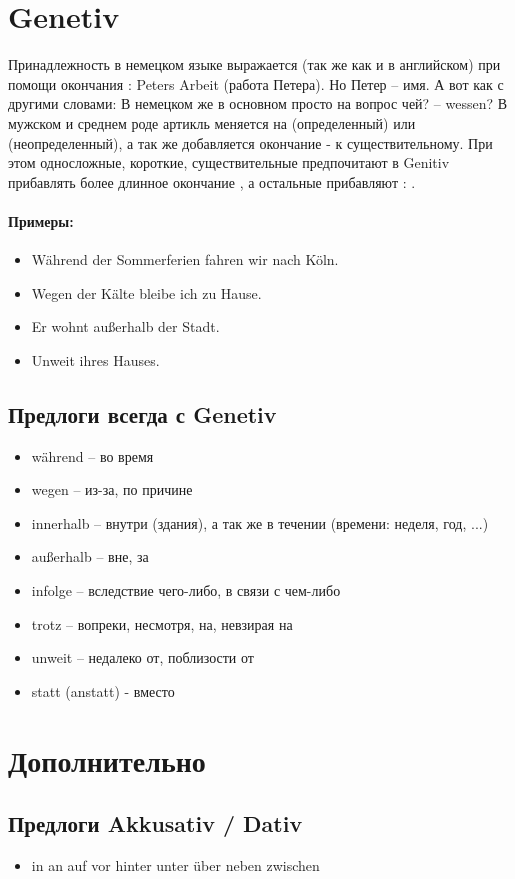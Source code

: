 \section{Genetiv}

Принадлежность в немецком языке выражается (так же как и в английском) при помощи окончания : Peters Arbeit (работа Петера). Но Петер – имя. А вот как с другими словами: В немецком же в основном просто на вопрос чей? – wessen?
В мужском и среднем роде артикль меняется на  (определенный) или  (неопределенный), а так же добавляется окончание -  к существительному. При этом односложные, короткие, существительные предпочитают в Genitiv прибавлять более длинное окончание , а остальные прибавляют : .

\paragraph{Примеры:}

\begin{itemize}
\item Während der Sommerferien fahren wir nach Köln.
~\\ 
\item Wegen der Kälte bleibe ich zu Hause.
~\\ 
\item Er wohnt außerhalb der Stadt.
~\\ 
\item Unweit ihres Hauses.
~\\ 
\end{itemize}

\subsection{Предлоги всегда с Genetiv}

\begin{itemize}
\item während -- во время
\item wegen -- из-за, по причине
\item innerhalb -- внутри (здания), а так же в течении (времени: неделя, год, ...)
\item außerhalb -- вне, за
\item infolge -- вследствие чего-либо, в связи с чем-либо
\item trotz -- вопреки, несмотря, на, невзирая на
\item unweit -- недалеко от, поблизости от
\item statt (anstatt) - вместо
\end{itemize}

\section{Дополнительно}

\subsection{Предлоги Akkusativ / Dativ}
\begin{itemize}
\item in an auf vor hinter unter über neben zwischen
\end{itemize}


